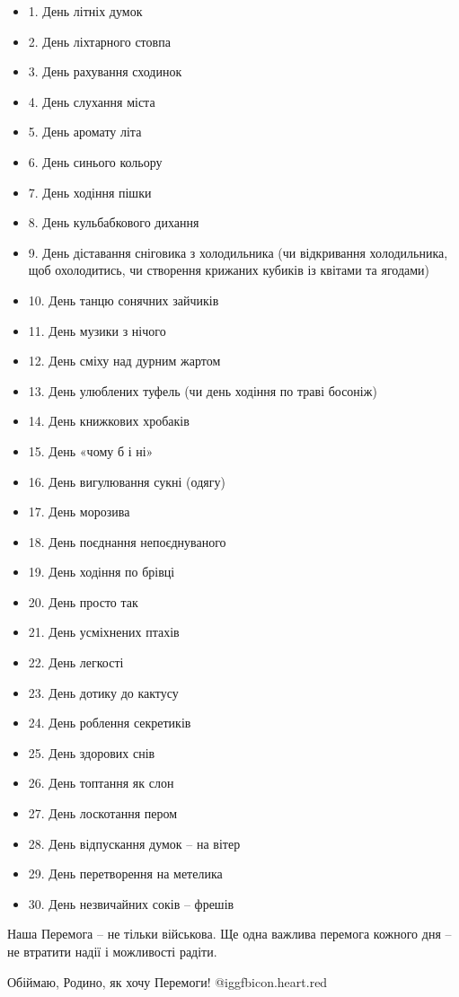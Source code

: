 \begin{itemize}
  \item 1. День літніх думок
  \item 2. День ліхтарного стовпа
  \item 3. День рахування сходинок
  \item 4. День слухання міста
  \item 5. День аромату літа
  \item 6. День синього кольору
  \item 7. День ходіння пішки
  \item 8. День кульбабкового дихання
  \item 9. День діставання сніговика з холодильника (чи відкривання холодильника, щоб охолодитись, чи створення крижаних кубиків із квітами та ягодами)
  \item 10. День танцю сонячних зайчиків
  \item 11. День музики з нічого
  \item 12. День сміху над дурним жартом
  \item 13. День улюблених туфель (чи день ходіння по траві босоніж)
  \item 14. День книжкових хробаків
  \item 15. День «чому б і ні»
  \item 16. День вигулювання сукні (одягу)
  \item 17. День морозива
  \item 18. День поєднання непоєднуваного
  \item 19. День ходіння по брівці
  \item 20. День просто так
  \item 21. День усміхнених птахів
  \item 22. День легкості
  \item 23. День дотику до кактусу
  \item 24. День роблення секретиків
  \item 25. День здорових снів
  \item 26. День топтання як слон
  \item 27. День лоскотання пером
  \item 28. День відпускання думок – на вітер
  \item 29. День перетворення на метелика
  \item 30. День незвичайних соків – фрешів
\end{itemize}

Наша Перемога – не тільки військова. Ще одна важлива перемога кожного дня – не
втратити надії і можливості радіти. 

Обіймаю, Родино, як хочу Перемоги! @igg{fbicon.heart.red}
